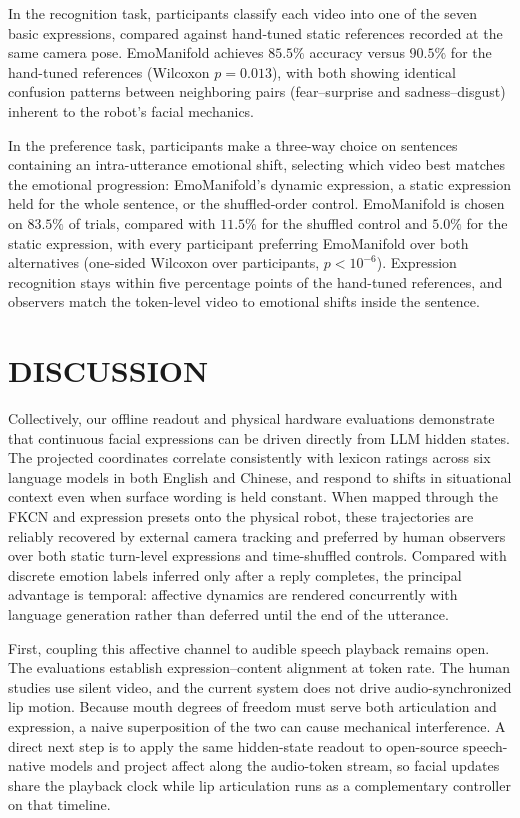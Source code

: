 \documentclass[letterpaper, 10 pt, conference]{ieeeconf}
\begin{document}
In the recognition task, participants classify each video into one of the seven basic expressions, compared against hand-tuned static references recorded at the same camera pose. EmoManifold achieves $85.5\%$ accuracy versus $90.5\%$ for the hand-tuned references (Wilcoxon $p{=}0.013$), with both showing identical confusion patterns between neighboring pairs (fear--surprise and sadness--disgust) inherent to the robot's facial mechanics.

In the preference task, participants make a three-way choice on sentences containing an intra-utterance emotional shift, selecting which video best matches the emotional progression: EmoManifold's dynamic expression, a static expression held for the whole sentence, or the shuffled-order control. EmoManifold is chosen on $83.5\%$ of trials, compared with $11.5\%$ for the shuffled control and $5.0\%$ for the static expression, with every participant preferring EmoManifold over both alternatives (one-sided Wilcoxon over participants, $p<10^{-6}$). Expression recognition stays within five percentage points of the hand-tuned references, and observers match the token-level video to emotional shifts inside the sentence.

\section{DISCUSSION}
\label{sec:discussion}

Collectively, our offline readout and physical hardware evaluations demonstrate that continuous facial expressions can be driven directly from LLM hidden states. The projected coordinates correlate consistently with lexicon ratings across six language models in both English and Chinese, and respond to shifts in situational context even when surface wording is held constant. When mapped through the FKCN and expression presets onto the physical robot, these trajectories are reliably recovered by external camera tracking and preferred by human observers over both static turn-level expressions and time-shuffled controls. Compared with discrete emotion labels inferred only after a reply completes, the principal advantage is temporal: affective dynamics are rendered concurrently with language generation rather than deferred until the end of the utterance.

First, coupling this affective channel to audible speech playback remains open. The evaluations establish expression--content alignment at token rate. The human studies use silent video, and the current system does not drive audio-synchronized lip motion. Because mouth degrees of freedom must serve both articulation and expression, a naive superposition of the two can cause mechanical interference. A direct next step is to apply the same hidden-state readout to open-source speech-native models and project affect along the audio-token stream, so facial updates share the playback clock while lip articulation runs as a complementary controller on that timeline.
\end{document}
